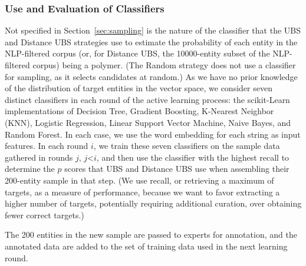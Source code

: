 \subsubsection{Use and Evaluation of Classifiers}
Not specified in Section~\ref{sec:sampling} is the nature of the classifier that the UBS and Distance UBS strategies
use to estimate the probability of each entity in the NLP-filtered corpus (or, for Distance UBS,
the \num{10000}-entity subset of the NLP-filtered corpus) being a polymer.
(The Random strategy does not use a classifier for sampling, as it selects candidates at random.)
As we have no prior knowledge of the distribution of target entities in the vector space, 
we consider seven distinct classifiers in each round of the active learning process:
the scikit-Learn~\cite{scikit-learn} implementations of Decision Tree,
Gradient Boosting,
K-Nearest Neighbor (KNN), 
Logistic Regression, 
Linear Support Vector Machine,
Naive Bayes, 
and Random Forest. %
In each case, we use the word embedding for each string as input features.
In each round $i$, we train these seven classifiers on the sample data gathered in rounds $j$, $j$<$i$,
and then use the classifier with the highest recall to determine the $p$ scores that UBS and Distance UBS use when
assembling their 200-entity sample in that step.
(We use recall, or retrieving a maximum of targets, as a measure of performance, because we want to favor
extracting a higher number of targets, potentially requiring additional curation, over obtaining fewer correct targets.)

The 200 entities in the new sample are passed to experts for annotation,
and the annotated data are added to the set of training data used in the next learning round.


